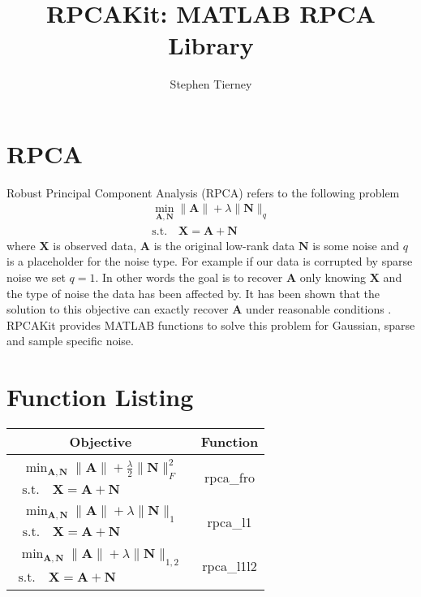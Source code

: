 \documentclass{article}
\begin{document}
\title{RPCAKit: MATLAB RPCA Library}
\author{Stephen Tierney}
\maketitle


\section{RPCA}

Robust Principal Component Analysis (RPCA) \cite{candes2011robust} refers to the following problem
\begin{align}
\min_{\mathbf{A, N}} \|\mathbf A \| + \lambda\|\mathbf N\|_{q} \\
\text{s.t.} \quad \mathbf{X = A + N} \nonumber
\end{align}
where $\mathbf X$ is observed data, $\mathbf A$ is the original low-rank data $\mathbf N$ is some noise and $q$ is a placeholder for the noise type. For example if our data is corrupted by sparse noise we set $q = 1$. In other words the goal is to recover $\mathbf A$ only knowing $\mathbf X$ and the type of noise the data has been affected by. It has been shown that the solution to this objective can exactly recover $\mathbf A$ under reasonable conditions \cite{candes2011robust}. RPCAKit provides MATLAB functions to solve this problem for Gaussian, sparse and sample specific noise.

\section{Function Listing}

\begin{table}[!h]
{\small{
\centering

\begin{tabular}{c | c}
\hline
Objective & Function \\
\hline

$\begin{array}{c} \min_{\mathbf{A, N}} \|\mathbf A \| + \frac{\lambda}{2} \|\mathbf N\|_F^2 \\
\text{s.t.} \quad \mathbf{X = A + N} \end{array}$
	& rpca\_fro  \\
\hline

$\begin{array}{c} \min_{\mathbf{A, N}} \|\mathbf A \| + \lambda \|\mathbf N\|_1 \\
\text{s.t.} \quad \mathbf{X = A + N} \end{array}$
	& rpca\_l1  \\
\hline

$\begin{array}{c} \min_{\mathbf{A, N}} \|\mathbf A \| + \lambda \|\mathbf N\|_{1,2} \\
\text{s.t.} \quad \mathbf{X = A + N} \end{array}$
	& rpca\_l1l2  \\
\hline

\end{tabular}
}}
\end{table}
\end{document}
